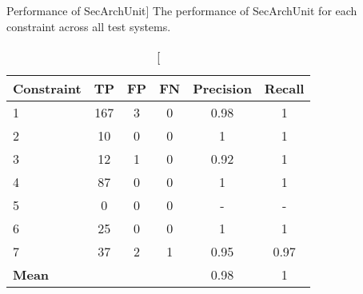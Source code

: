 \begin{table}[h]
\captionsetup{justification=centering}
\caption
    [Performance of SecArchUnit]
    {The performance of SecArchUnit for each constraint across all test systems.}
\begin{center}
\begin{tabular}{lccccc}
                    \textbf{Constraint}  & \textbf{TP} & \textbf{FP} & \textbf{FN} & \textbf{Precision} & \textbf{Recall} \\
\hline
1 & 167         & 3           & 0           & 0.98      & 1          \\
\rowcolor{RowColor}
2 & 10          & 0           & 0           & 1      & 1          \\
3 & 12          & 1           & 0           & 0.92      & 1          \\
\rowcolor{RowColor}
4 & 87          & 0           & 0           & 1      & 1          \\
5 & 0           & 0           & 0           & -      & -         \\
\rowcolor{RowColor}
6 & 25 & 0 & 0 & 1 & 1 \\
7 & 37 & 2 & 1 & 0.95 & 0.97 \\
\hline
\textbf{Mean}         &             &             &             & 0.98      & 1         
\end{tabular}
\end{center}

\label{tab:secarchUnit_constraint}
\end{table}